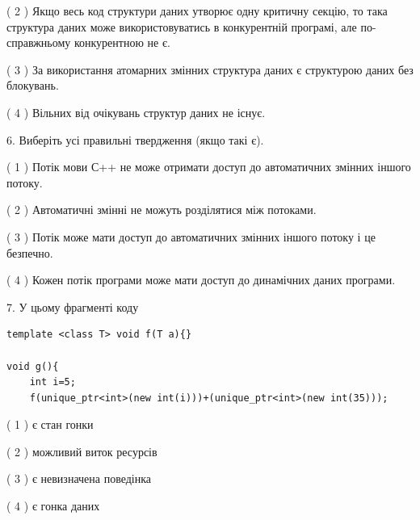 \documentclass[12pt, ukrainian]{article}
\begin{document}
\begin {large}
{( 2 ) Якщо весь код структури даних утворює одну критичну секцію, то така структура даних може використовуватись в конкурентній програмі, але по-справжньо\-му конкурентною не є.%

( 3 ) За використання атомарних змінних структура даних є структурою даних без блокувань.%

( 4 ) Вільних від очікувань структур даних не існує.%
\newpage



\vspace{5mm}
6. Виберіть усі правильні твердження (якщо такі є).\par
\vspace{2mm}

( 1 ) Потік мови С++ не може отримати доступ до автоматичних змінних іншого потоку.%

( 2 ) Автоматичні змінні не можуть розділятися між потоками.%

( 3 ) Потік може мати доступ до автоматичних змінних іншого потоку і це безпечно.%

( 4 ) Кожен потік програми може мати доступ до динамічних даних програми.%


\vspace{5mm}
7. У цьому фрагменті коду
\begin{verbatim}
template <class T> void f(T a){}

void g(){
    int i=5;
    f(unique_ptr<int>(new int(i)))+(unique_ptr<int>(new int(35)));
\end{verbatim}
( 1 ) є стан гонки%

( 2 ) можливий виток ресурсів%

( 3 ) є невизначена поведінка%

( 4 ) є гонка даних%
}
\end {large}
\end{document}

